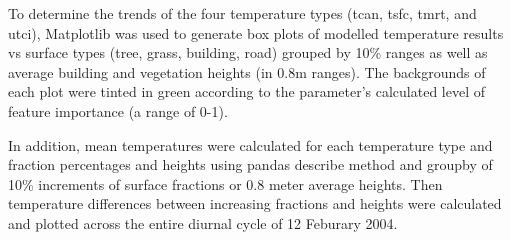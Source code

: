 \documentclass[final,3p,times,authoryear]{elsarticle}
\begin{document}
%

To determine the trends of the four temperature types (\gls{tcan}, \gls{tsfc}, \gls{tmrt}, and \gls{utci}), Matplotlib \citep{Hunter2007} was used to generate box plots of modelled temperature results vs surface types (tree, grass, building, road) grouped by 10\% ranges as well as average building and vegetation heights (in 0.8m ranges). The backgrounds of each plot were tinted in green according to the parameter's calculated level of feature importance (a range of 0-1).


In addition, mean temperatures were calculated for each temperature type and fraction percentages and heights using pandas \citep{reback2020pandas} describe method and groupby of 10\% increments of surface fractions or 0.8 meter average heights. Then temperature differences between increasing fractions and heights were calculated and plotted across the entire diurnal cycle of 12 Feburary 2004.
\end{document}
